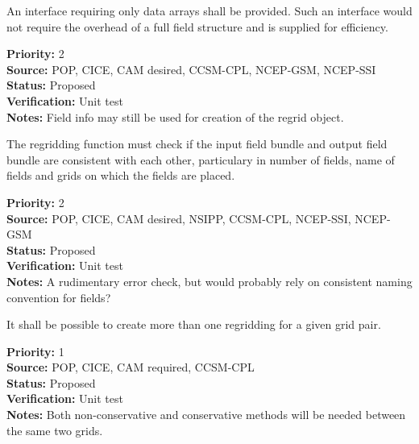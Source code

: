 An interface requiring only data arrays shall be
provided.  Such an interface would not require the overhead
of a full field structure and is supplied for efficiency.

\begin{reqlist}
{\bf Priority:} 2 \\
{\bf Source:} POP, CICE, CAM desired, CCSM-CPL, NCEP-GSM, NCEP-SSI \\
{\bf Status:} Proposed \\
{\bf Verification:} Unit test \\
{\bf Notes:} Field info may still be used for creation of the
             regrid object.
\end{reqlist}


The regridding function must check if the input field bundle and output field
bundle are consistent with each other, particulary in number of fields, name of
fields and grids on which the fields are placed.

\begin{reqlist}
{\bf Priority:} 2 \\
{\bf Source:} POP, CICE, CAM desired, NSIPP, CCSM-CPL, NCEP-SSI, NCEP-GSM \\
{\bf Status:} Proposed \\
{\bf Verification:} Unit test \\
{\bf Notes:} A rudimentary error check, but would probably rely on
             consistent naming convention for fields?
\end{reqlist}


It shall be possible to create more than one regridding for a given grid
pair.

\begin{reqlist}
{\bf Priority:} 1 \\
{\bf Source:} POP, CICE, CAM required, CCSM-CPL \\
{\bf Status:} Proposed \\
{\bf Verification:} Unit test \\
{\bf Notes:} Both non-conservative and conservative methods will be needed
             between the same two grids.
\end{reqlist}


